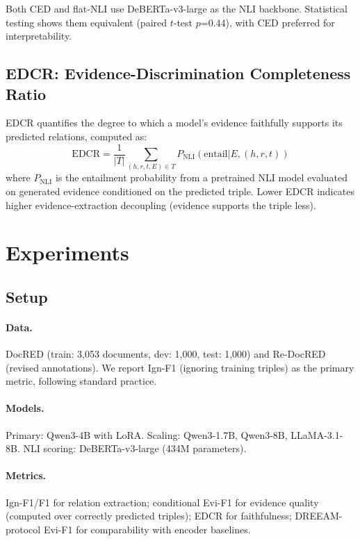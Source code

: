 \documentclass[11pt,a4paper]{article}
\begin{document}
Both CED and flat-NLI use DeBERTa-v3-large as the NLI backbone. Statistical testing shows them equivalent (paired $t$-test $p$=0.44), with CED preferred for interpretability.

\subsection{EDCR: Evidence-Discrimination Completeness Ratio}

EDCR quantifies the degree to which a model's evidence faithfully supports its predicted relations, computed as:
\begin{equation}
\text{EDCR} = \frac{1}{|T|} \sum_{(h,r,t,E) \in T} P_{\text{NLI}}(\text{entail} | E, (h,r,t))
\end{equation}
where $P_{\text{NLI}}$ is the entailment probability from a pretrained NLI model evaluated on generated evidence conditioned on the predicted triple. Lower EDCR indicates higher evidence-extraction decoupling (evidence supports the triple less).

\section{Experiments}

\subsection{Setup}

\paragraph{Data.} DocRED \cite{yao2019docred} (train: 3,053 documents, dev: 1,000, test: 1,000) and Re-DocRED (revised annotations). We report Ign-F1 (ignoring training triples) as the primary metric, following standard practice.

\paragraph{Models.} Primary: Qwen3-4B with LoRA. Scaling: Qwen3-1.7B, Qwen3-8B, LLaMA-3.1-8B. NLI scoring: DeBERTa-v3-large (434M parameters).

\paragraph{Metrics.} Ign-F1/F1 for relation extraction; conditional Evi-F1 for evidence quality (computed over correctly predicted triples); EDCR for faithfulness; DREEAM-protocol Evi-F1 for comparability with encoder baselines.
\end{document}

